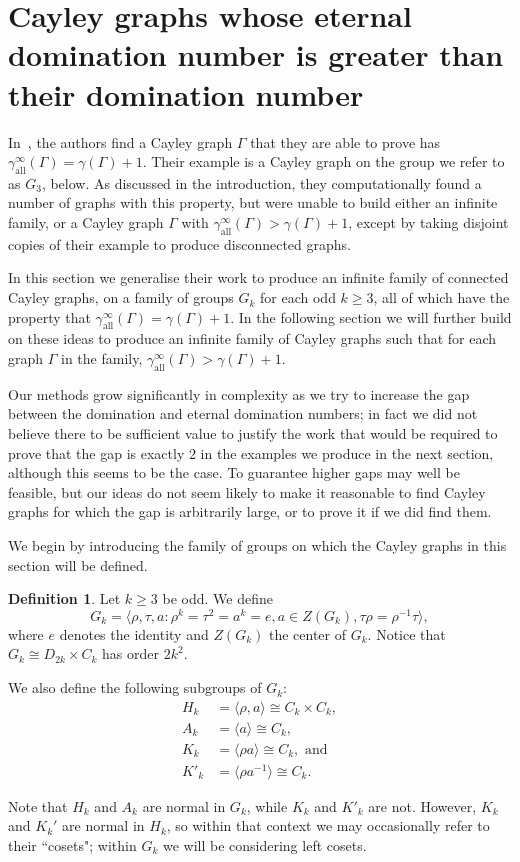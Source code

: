 \documentclass{amsart}
\theoremstyle{remark}
\theoremstyle{definition}
\newtheorem{defn}[thm]{Definition}
\newcommand{\etdom}{\gamma_{\mathrm{all}}^\infty}
\begin{document}
\section{Cayley graphs whose eternal domination number is greater than their domination number}

In~\cite{BSL2016}, the authors find a Cayley graph $\Gamma$ that they are able to prove has $\etdom(\Gamma)=\gamma(\Gamma)+1$. Their example is a Cayley graph on the group we refer to as $G_3$, below. As discussed in the introduction, they computationally found a number of graphs with this property, but were unable to build either an infinite family, or a Cayley graph $\Gamma$ with $\etdom(\Gamma)>\gamma(\Gamma)+1$, except by taking disjoint copies of their example to produce disconnected graphs.

In this section we generalise their work to produce an infinite family of connected Cayley graphs,  on a family of groups $G_k$ for each odd $k \ge 3$, all of which have the property that $\etdom(\Gamma)=\gamma(\Gamma)+1$. In the following section we will further build on these ideas to produce an infinite family of Cayley graphs such that for each graph $\Gamma$ in the family, $\etdom(\Gamma)>\gamma(\Gamma)+1$. 

Our methods grow significantly in complexity as we try to increase the gap between the domination and eternal domination numbers; in fact we did not believe there to be sufficient value to justify the work that would be required to prove that the gap is exactly $2$ in the examples we produce in the next section, although this seems to be the case. To guarantee higher gaps may well be feasible, but our ideas do not seem likely to make it reasonable to find Cayley graphs for which the gap is arbitrarily large, or to prove it if we did find them.

We begin by introducing the family of groups on which the Cayley graphs in this section will be defined.

\begin{defn}
    Let $k \ge 3$ be odd. We define $$G_k=\langle \rho, \tau,a: \rho^k=\tau^2=a^k=e, a \in Z(G_k), \tau\rho=\rho^{-1}\tau\rangle,$$ where $e$ denotes the identity and $Z(G_k)$ the center of $G_k$.
    Notice that $G_k \cong D_{2k} \times C_k$ has order $2k^2$.

    We also define the following subgroups of $G_k$: 
    \begin{align*}
  H_k&=\langle \rho,a\rangle \cong C_{k} \times C_k,\\ A_k&=\langle a \rangle \cong C_{k}, \\K_k&=\langle \rho a\rangle \cong C_k,\text{ and}\\ K'_k&=\langle \rho a^{-1}\rangle \cong C_k.
    \end{align*}
\end{defn}
Note that $H_k$ and $A_k$ are normal in $G_k$, while $K_k$ and $K'_k$ are not. However, $K_k$ and $K_k'$ are normal in $H_k$, so within that context we may occasionally refer to their ``cosets"; within $G_k$ we will be considering left cosets.
\end{document}

